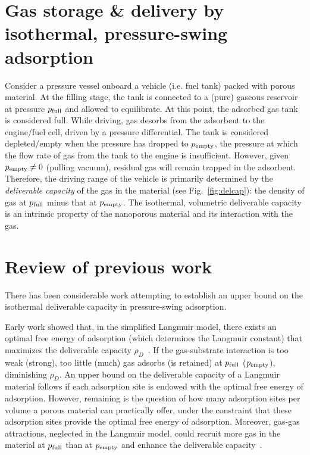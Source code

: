 \section{Gas storage \& delivery by isothermal, pressure-swing adsorption}
Consider a pressure vessel onboard a vehicle (i.e. fuel tank) packed with
porous material. At the filling stage, the tank is connected to a (pure)
gaseous reservoir at pressure $p_{\text{full}}$ and allowed to equilibrate. At this
point, the adsorbed gas tank is considered full. While driving, gas desorbs
from the adsorbent to the engine/fuel cell, driven by a pressure differential.
The tank is considered depleted/empty when the pressure has dropped to
$p_{\text{empty}}$, the pressure at which the flow rate of gas from the tank to the
engine is insufficient. However, given $p_{\text{empty}} \neq 0$ (pulling vacuum),
residual gas will remain trapped in the adsorbent. Therefore, the driving range
of the vehicle is primarily determined by the \emph{deliverable capacity} of
the gas in the material (see Fig.~\ref{fig:delcap}): the density of gas at
$p_{\text{full}}$ minus that at $p_{\text{empty}}$. The isothermal, volumetric deliverable
capacity is an intrinsic property of the nanoporous material and its
interaction with the gas.

\section{Review of previous work}
There has been considerable work attempting to establish an upper bound on the
isothermal deliverable capacity in pressure-swing adsorption.

Early work showed that, in the simplified Langmuir model, there exists an
optimal free energy of adsorption (which determines the Langmuir constant) that
maximizes the deliverable capacity
$\rho_D$~\cite{matranga1992storage,bhatia2006optimum,simon2014optimizing}. If
the gas-substrate interaction is too weak (strong), too little (much) gas
adsorbs (is retained) at $p_{\text{full}}$ ($p_{\text{empty}}$), diminishing $\rho_D$. An upper
bound on the deliverable capacity of a Langmuir material follows if each
adsorption site is endowed with the optimal free energy of adsorption. However,
remaining is the question of how many adsorption sites per volume a porous
material can practically offer, under the constraint that these adsorption
sites provide the optimal free energy of adsorption. Moreover, gas-gas
attractions, neglected in the Langmuir model, could recruit more gas in the
material at $p_{\text{full}}$ than at $p_{\text{empty}}$ and enhance the deliverable
capacity~\cite{simon2014optimizing}.

